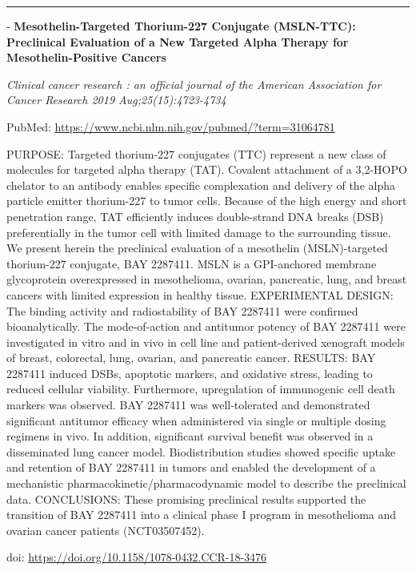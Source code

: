 \documentclass[]{article}
\begin{document}
\begin{center}\rule{0.5\linewidth}{\linethickness}\end{center}

 - \textbf{Mesothelin-Targeted Thorium-227 Conjugate (MSLN-TTC):
Preclinical Evaluation of a New Targeted Alpha Therapy for
Mesothelin-Positive Cancers}

\emph{Clinical cancer research : an official journal of the American
Association for Cancer Research 2019 Aug;25(15):4723-4734}

PubMed: \url{https://www.ncbi.nlm.nih.gov/pubmed/?term=31064781}

PURPOSE: Targeted thorium-227 conjugates (TTC) represent a new class of
molecules for targeted alpha therapy (TAT). Covalent attachment of a
3,2-HOPO chelator to an antibody enables specific complexation and
delivery of the alpha particle emitter thorium-227 to tumor cells.
Because of the high energy and short penetration range, TAT efficiently
induces double-strand DNA breaks (DSB) preferentially in the tumor cell
with limited damage to the surrounding tissue. We present herein the
preclinical evaluation of a mesothelin (MSLN)-targeted thorium-227
conjugate, BAY 2287411. MSLN is a GPI-anchored membrane glycoprotein
overexpressed in mesothelioma, ovarian, pancreatic, lung, and breast
cancers with limited expression in healthy tissue. EXPERIMENTAL DESIGN:
The binding activity and radiostability of BAY 2287411 were confirmed
bioanalytically. The mode-of-action and antitumor potency of BAY 2287411
were investigated in vitro and in vivo in cell line and patient-derived
xenograft models of breast, colorectal, lung, ovarian, and pancreatic
cancer. RESULTS: BAY 2287411 induced DSBs, apoptotic markers, and
oxidative stress, leading to reduced cellular viability. Furthermore,
upregulation of immunogenic cell death markers was observed. BAY 2287411
was well-tolerated and demonstrated significant antitumor efficacy when
administered via single or multiple dosing regimens in vivo. In
addition, significant survival benefit was observed in a disseminated
lung cancer model. Biodistribution studies showed specific uptake and
retention of BAY 2287411 in tumors and enabled the development of a
mechanistic pharmacokinetic/pharmacodynamic model to describe the
preclinical data. CONCLUSIONS: These promising preclinical results
supported the transition of BAY 2287411 into a clinical phase I program
in mesothelioma and ovarian cancer patients (NCT03507452).

doi: \url{https://doi.org/10.1158/1078-0432.CCR-18-3476}
\end{document}
